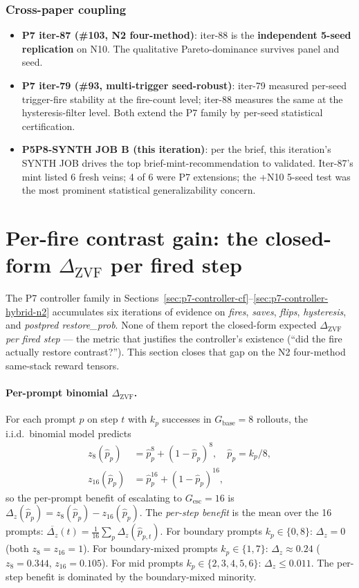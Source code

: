 \documentclass{article}
\begin{document}
\subsubsection{Cross-paper coupling}
\begin{itemize}
\item \textbf{P7 iter-87 (\#103, N2 four-method)}: iter-88 is the
      \textbf{independent 5-seed replication} on N10. The
      qualitative Pareto-dominance survives panel and seed.
\item \textbf{P7 iter-79 (\#93, multi-trigger seed-robust)}: iter-79
      measured per-seed trigger-fire stability at the fire-count level;
      iter-88 measures the same at the hysteresis-filter level. Both
      extend the P7 family by per-seed statistical certification.
\item \textbf{P5P8-SYNTH JOB B (this iteration)}: per the brief, this
      iteration's SYNTH JOB drives the top brief-mint-recommendation
      to validated. Iter-87's mint listed 6 fresh veins; 4 of 6 were P7
      extensions; the +N10 5-seed test was the most prominent statistical
      generalizability concern.
\end{itemize}
 \section{Per-fire contrast gain: the closed-form $\Delta_{\mathrm{ZVF}}$ per fired step}
\label{sec:p7-iter91-perfire-gain}

The P7 controller family in Sections~\ref{sec:p7-controller-cf}--\ref{sec:p7-controller-hybrid-n2}
accumulates six iterations of evidence on \emph{fires}, \emph{saves},
\emph{flips}, \emph{hysteresis}, and \emph{postpred restore\_prob}.
None of them report the closed-form expected $\Delta_{\mathrm{ZVF}}$
\emph{per fired step} --- the metric that justifies the controller's
existence (``did the fire actually restore contrast?''). This
section closes that gap on the N2 four-method same-stack reward tensors.

\paragraph{Per-prompt binomial $\Delta_{\mathrm{ZVF}}$.}
For each prompt $p$ on step $t$ with $k_p$ successes in $G_{\mathrm{base}}{=}8$
rollouts, the i.i.d.\ binomial model predicts
\begin{align}
z_8(\hat p_p)   &= \hat p_p^{8}   + (1-\hat p_p)^{8},   \quad \hat p_p = k_p/8, \\
z_{16}(\hat p_p) &= \hat p_p^{16} + (1-\hat p_p)^{16},
\end{align}
so the per-prompt benefit of escalating to $G_{\mathrm{esc}}{=}16$ is
$\Delta_z(\hat p_p) = z_8(\hat p_p) - z_{16}(\hat p_p)$. The
\emph{per-step benefit} is the mean over the 16 prompts:
$\overline{\Delta_z}(t) = \tfrac{1}{16}\sum_p \Delta_z(\hat p_{p,t})$.
For boundary prompts $k_p\in\{0,8\}$: $\Delta_z = 0$ (both
$z_8 = z_{16} = 1$). For boundary-mixed prompts
$k_p\in\{1,7\}$: $\Delta_z \approx 0.24$
($z_8 = 0.344$, $z_{16} = 0.105$). For mid prompts
$k_p\in\{2,3,4,5,6\}$: $\Delta_z \le 0.011$. The per-step benefit
is dominated by the boundary-mixed minority.
\end{document}
